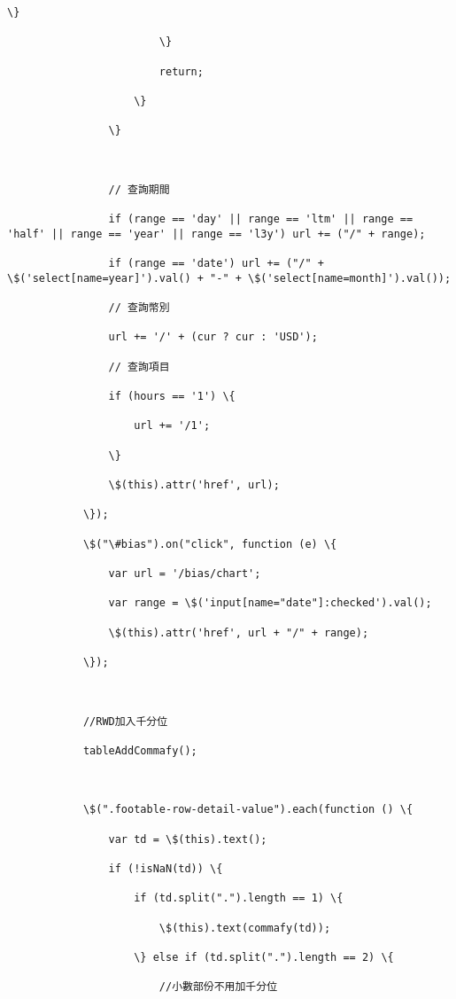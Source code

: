 \documentclass[11pt]{article}
\begin{document}
\begin{Verbatim}[commandchars=\\\{\}]
                            \}

                        \}

                        return;

                    \}

                \}



                // 查詢期間

                if (range == 'day' || range == 'ltm' || range == 'half' || range == 'year' || range == 'l3y') url += ("/" + range);

                if (range == 'date') url += ("/" + \$('select[name=year]').val() + "-" + \$('select[name=month]').val());

                // 查詢幣別

                url += '/' + (cur ? cur : 'USD');

                // 查詢項目

                if (hours == '1') \{

                    url += '/1';

                \}

                \$(this).attr('href', url);

            \});

            \$("\#bias").on("click", function (e) \{

                var url = '/bias/chart';

                var range = \$('input[name="date"]:checked').val();

                \$(this).attr('href', url + "/" + range);

            \});



            //RWD加入千分位

            tableAddCommafy();



            \$(".footable-row-detail-value").each(function () \{

                var td = \$(this).text();

                if (!isNaN(td)) \{

                    if (td.split(".").length == 1) \{

                        \$(this).text(commafy(td));

                    \} else if (td.split(".").length == 2) \{

                        //小數部份不用加千分位


\end{Verbatim}
\end{document}
